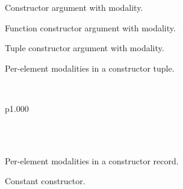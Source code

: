 \label{Oxcaml--type-modalities_gadt}\begin{ocamlindent}\label{Oxcaml--type-modalities_gadt.A}%
\begin{ocamlindent}Constructor argument with  modality.\end{ocamlindent}%
\label{Oxcaml--type-modalities_gadt.B}%
\begin{ocamlindent}Function constructor argument with modality.\end{ocamlindent}%
\label{Oxcaml--type-modalities_gadt.C}%
\begin{ocamlindent}Tuple constructor argument with modality.\end{ocamlindent}%
\label{Oxcaml--type-modalities_gadt.D}%
\begin{ocamlindent}Per-element modalities in a constructor tuple.\end{ocamlindent}%
\\
\begin{ocamltabular}{p{1.000\textwidth}}\label{Oxcaml--type-modalities_gadt.x}\\
\label{Oxcaml--type-modalities_gadt.y}\\
\end{ocamltabular}%
\\
\label{Oxcaml--type-modalities_gadt.E}%
\begin{ocamlindent}Per-element modalities in a constructor record.\end{ocamlindent}%
\label{Oxcaml--type-modalities_gadt.F}%
\begin{ocamlindent}Constant constructor.\end{ocamlindent}%
\end{ocamlindent}%
